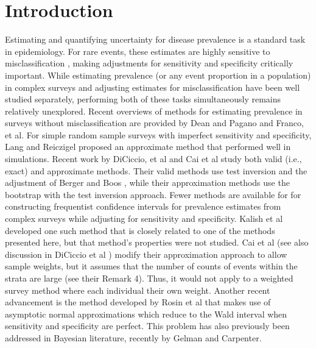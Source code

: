 \documentclass[AMA,STIX1COL]{WileyNJD-v2}
\begin{document}
\maketitle


\section{Introduction}

Estimating and quantifying uncertainty for disease prevalence is a standard task in epidemiology.
For rare events, these estimates are highly sensitive to misclassification \cite{hemenwaySelfDefense}, making adjustments for sensitivity and specificity critically important.
While estimating prevalence (or any event proportion in a population) in complex surveys and adjusting estimates for misclassification have been well studied separately, performing both of these tasks simultaneously remains relatively unexplored.
Recent overviews of methods for estimating prevalence in surveys without misclassification are provided by Dean and Pagano\cite{Dean:2015} and Franco, et al\cite{franco2019}.
For  simple random sample surveys with imperfect sensitivity and specificity, Lang and Reiczigel\cite{Lang:2014} proposed an approximate method that performed well in simulations. Recent work by DiCiccio, et al \cite{DiCi:2021} and Cai et al \cite{Cai:2020} study both valid (i.e., exact) and approximate methods. Their valid methods use test inversion and the adjustment of Berger and Boos \cite{Berg:1994}, while their approximation methods use the bootstrap with the test inversion approach. 
Fewer methods are available for for constructing frequentist confidence intervals for prevalence estimates from complex surveys while adjusting for sensitivity and specificity.
Kalish et al\cite{Kali:2021} developed one such method that is closely related to one of the methods presented here, but that method's properties were not studied.
Cai et al \cite{Cai:2020} (see also discussion in DiCiccio et al \cite{DiCi:2021}) modify their approximation approach to allow sample weights, but it assumes that the number of counts of events within the strata are large (see their Remark 4).  Thus, it would not apply to a weighted survey method where each individual their own weight. 
Another recent advancement is the method developed by Rosin et al \cite{rosin2021estimating} that 
 makes use of asymptotic normal approximations which reduce to the Wald interval when sensitivity and specificity are perfect.
This problem has also previously been addressed in Bayesian literature, recently by Gelman and Carpenter\cite{GelmanBayes}.
\end{document}
